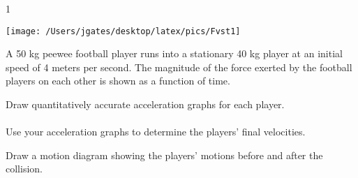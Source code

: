 
\AddToShipoutPicture*{\BackgroundPic}

\addtocounter {ProbNum} {1}

\begin{floatingfigure}[r]{.54\textwidth}
\texttt{[image: /Users/jgates/desktop/latex/pics/Fvst1]}
\end{floatingfigure}
 
{\bf \Large{}} A 50 kg peewee football player runs into a stationary 40 kg player at an initial speed of 4 meters per second. The magnitude of the force exerted by the football players on each other is shown as a function of time. 

\bigskip
Draw quantitatively accurate acceleration graphs for each player.
\paragraph{}
\noindent
\vfill
Use your acceleration graphs to determine the players' final velocities.
\vfill

Draw a motion diagram showing the players' motions before and after the collision.
\vspace{20mm}

\newpage